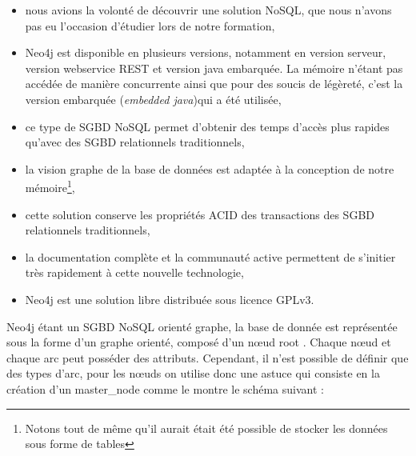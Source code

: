 \begin{itemize}
\item nous avions la volonté de découvrir une solution \gls{NoSQL}, que nous n'avons pas eu l'occasion d'étudier lors de notre formation,

\item Neo4j est disponible en plusieurs versions, notamment en version serveur, version webservice REST et version java embarquée. La mémoire n'étant pas accédée de manière concurrente ainsi que pour des soucis de légèreté, c'est la version embarquée (\emph{embedded java})qui a été utilisée,

\item ce type de \gls{SGBD} \gls{NoSQL} permet d'obtenir des temps d'accès plus rapides qu'avec des \gls{SGBD} relationnels traditionnels,

\item la vision graphe de la base de données est adaptée à la conception de notre mémoire\footnote{Notons tout de même qu'il aurait était été possible de stocker les données sous forme de tables},

\item cette solution conserve les propriétés \gls{ACID} des transactions des \gls{SGBD} relationnels traditionnels,

\item la documentation complète et la communauté active permettent de s'initier très rapidement à cette nouvelle technologie,

\item Neo4j est une solution libre distribuée sous licence \gls{GPLv3}.
\end{itemize}

Neo4j étant un \gls{SGBD} \gls{NoSQL} orienté graphe, la base de donnée est représentée sous la forme d'un graphe orienté, composé d'un nœud \og root \fg{}. Chaque nœud et chaque arc peut posséder des attributs. Cependant, il n'est possible de définir que des types d'arc, pour les nœuds on utilise donc une astuce qui consiste en la création d'un \og master\_node \fg{} comme le montre le schéma suivant : 

